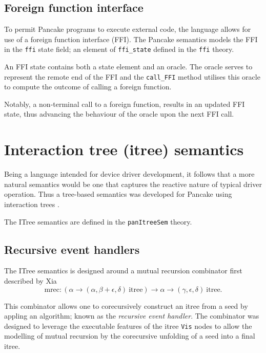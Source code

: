 \documentclass[12pt,a4paper]{report}
\begin{document}
\subsection{Foreign function interface}
\label{sec:fore-funct-interf}

To permit Pancake programs to execute external code, the language allows for use of a foreign function interface (FFI). The Pancake semantics models the FFI in the \texttt{ffi} state field; an element of \texttt{ffi\_state} defined in the \texttt{ffi} theory.

An FFI state contains both a state element and an oracle. The oracle serves to represent the remote end of the FFI and the \texttt{call\_FFI} method utilises this oracle to compute the outcome of calling a foreign function.

Notably, a non-terminal call to a foreign function, results in an updated FFI state, thus advancing the behaviour of the oracle upon the next FFI call.

\section{Interaction tree (itree) semantics}
\label{sec:itree-semantics}

Being a language intended for device driver development, it follows that a more natural semantics would be one that captures the reactive nature of typical driver operation. Thus a tree-based semantics was developed for Pancake using interaction trees \cite{xia_executable_nodate}.

The ITree semantics are defined in the \texttt{panItreeSem} theory.

\subsection{Recursive event handlers}
\label{sec:recursive-handlers}

The ITree semantics is designed around a mutual recursion combinator first described by Xia \cite{xia_executable_nodate}
\begin{equation*}
  \text{mrec} : (\alpha \to (\alpha, \beta + \epsilon, \delta)\ \text{itree}) \to \alpha \to (\gamma, \epsilon, \delta)\ \text{itree}.
\end{equation*}

This combinator allows one to corecursively construct an itree from a seed by appling an algorithm; known as the \emph{recursive event handler}. The combinator was designed to leverage the executable features of the itree \texttt{Vis} nodes to allow the modelling of mutual recursion by the corecursive unfolding of a seed into a final itree.
\end{document}
